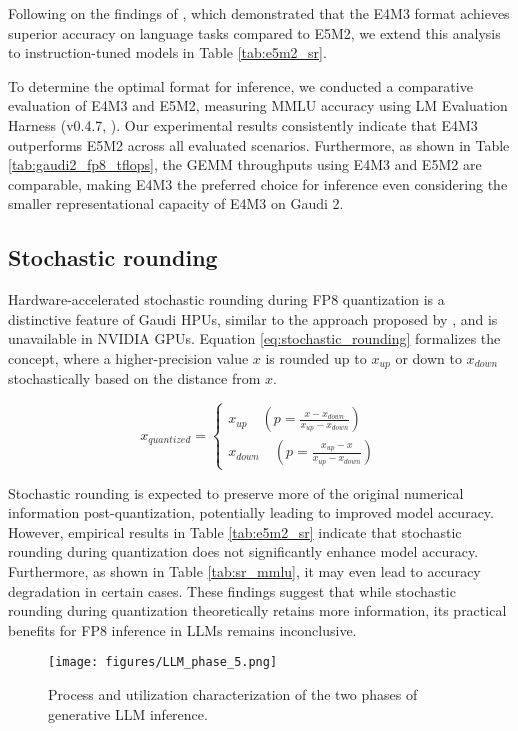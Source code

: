 Following on the findings of \citet{MLSYS2024_dea9b4b6}, which demonstrated that the E4M3 format achieves superior accuracy on language tasks compared to E5M2, we extend this analysis to instruction-tuned models in Table \ref{tab:e5m2_sr}.
 
To determine the optimal format for inference, we conducted a comparative evaluation of E4M3 and E5M2, measuring MMLU accuracy using LM Evaluation Harness (v0.4.7, \citep{eval-harness}).
Our experimental results consistently indicate that E4M3 outperforms E5M2 across all evaluated scenarios.
Furthermore, as shown in Table \ref{tab:gaudi2_fp8_tflops}, the GEMM throughputs using E4M3 and E5M2 are comparable, making E4M3 the preferred choice for inference even considering the smaller representational capacity of E4M3 on Gaudi 2.




\subsection{Stochastic rounding}

Hardware-accelerated stochastic rounding during FP8 quantization is a distinctive feature of Gaudi HPUs, similar to the approach proposed by \citet{hlat}, and is unavailable in NVIDIA GPUs.
Equation  \ref{eq:stochastic_rounding} formalizes the concept, where a higher-precision value  $x$ is rounded up to $x_{up}$ or down to $x_{down}$ stochastically based on the distance from $x$. 

\begin{equation}
  x_{quantized} =
    \begin{cases}
      x_{up}   \quad (p=\frac{x-x_{down}}{x_{up}-x_{down}}) \\
      x_{down} \quad (p=\frac{x_{up}-x}{x_{up}-x_{down}})
    \end{cases}
\label{eq:stochastic_rounding}
\end{equation}

Stochastic rounding is expected to preserve more of the original numerical information post-quantization, potentially leading to improved model accuracy.
However, empirical results in Table \ref{tab:e5m2_sr} indicate that stochastic rounding during quantization does not significantly enhance model accuracy. Furthermore, as shown in Table \ref{tab:sr_mmlu}, it may even lead to accuracy degradation in certain cases. These findings suggest that while stochastic rounding during quantization theoretically retains more information, its practical benefits for FP8 inference in LLMs remains inconclusive.

\begin{figure*}[]
    \centering
    \texttt{[image: figures/LLM\_phase\_5.png]}
    \vspace{-1em}
    \caption{Process and utilization characterization of the two phases of generative LLM inference.}
    \label{fig:decode_diagram}
    \vskip -0.1in 
\end{figure*}